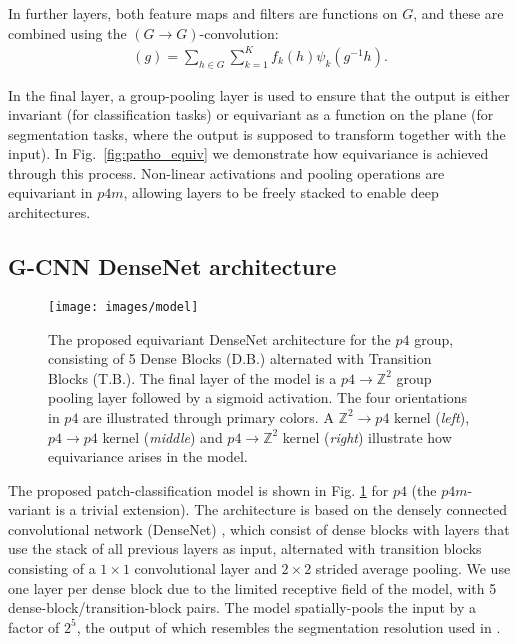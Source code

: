 \documentclass{llncs}
\begin{document}
In further layers, both feature maps and filters are functions on $G$, and these are combined using the $(G\rightarrow G)$-convolution:
\begin{align}
    [f * \psi](g) = \sum_{h\in G}\sum^K_{k=1} f_k(h)\psi_k(g^{-1} h).
\end{align}





In the final layer, a group-pooling layer is used to ensure that the output is either invariant (for classification tasks) or equivariant as a function on the plane (for segmentation tasks, where the output is supposed to transform together with the input). In Fig.~\ref{fig:patho_equiv} we demonstrate how equivariance is achieved through this process. Non-linear activations and pooling operations are equivariant in $p4m$\cite{Cohen2016-do}, allowing layers to be freely stacked to enable deep architectures.

\subsection{G-CNN DenseNet architecture}
\begin{figure}[t]
\centerline{\texttt{[image: images/model]}}

\caption{The proposed equivariant DenseNet architecture for the $p4$ group, consisting of 5 Dense Blocks (D.B.) alternated with Transition Blocks (T.B.). The final layer of the model is a $p4\rightarrow\mathbb{Z}^2$ group pooling layer followed by a sigmoid activation. The four orientations in $p4$ are illustrated through primary colors. A $\mathbb{Z}^2\rightarrow p4$ kernel (\textit{left}), $p4\rightarrow p4$ kernel (\textit{middle}) and $p4 \rightarrow \mathbb{Z}^2$ kernel (\textit{right}) illustrate how equivariance arises in the model.}\label{fig:model}
\end{figure}
The proposed patch-classification model is shown in Fig. \ref{fig:model} for $p4$ (the $p4m$-variant is a trivial extension). The architecture is based on the densely connected convolutional network (DenseNet) \cite{Huang2016-dq}, which consist of dense blocks with layers that use the stack of all previous layers as input, alternated with transition blocks consisting of a $1 \times 1$ convolutional layer and $2 \times 2$ strided average pooling. We use one layer per dense block due to the limited receptive field of the model, with 5 dense-block/transition-block pairs. The model spatially-pools the input by a factor of $2^5$, the output of which resembles the segmentation resolution used in \cite{Liu2017-jq}. 
\end{document}
